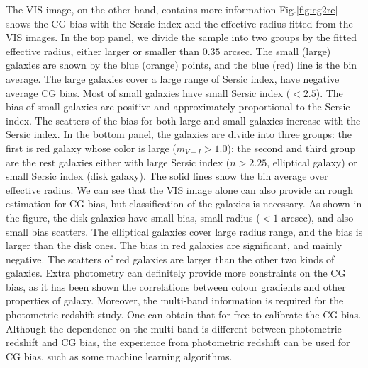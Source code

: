 \documentclass[useAMS,usenatbib]{mnras}
\newcommand{\be}{\begin{equation}}
\newcommand{\ee}{\end{equation}}
\def\elabel#1{\label{eq:#1}}
\begin{document}
The VIS image, on the other hand, contains more information
Fig.\ref{fig:cg2re} shows the CG bias with the Sersic index
and the effective radius fitted from the VIS images. In the top panel,
we divide the sample into two groups by the fitted effective radius,
either larger or smaller than $0.35$ arcsec. The small (large)
galaxies are shown by the blue (orange) points, and the blue (red)
line is the bin average.  The large galaxies cover a large range of
Sersic index, have negative average CG bias. Most of small galaxies
have small Sersic index ($<2.5$). The bias of small galaxies are
positive and approximately proportional to the Sersic index. The
scatters of the bias for both large and small galaxies increase with
the Sersic index.
%
In the bottom panel, the galaxies are divide into three groups: the
first is red galaxy whose color is large ($m_{V-I}>1.0$); the second
and third group are the rest galaxies either with large Sersic index
($n>2.25$, elliptical galaxy) or small Sersic index (disk galaxy). The
solid lines show the bin average over effective radius.
%
%
%
We can see that the VIS image alone can also provide an rough
estimation for CG bias, but classification of the galaxies is
necessary. As shown in the figure, the disk galaxies have small bias,
small radius ($<1$ arcsec), and also small bias scatters. The
elliptical galaxies cover large radius range, and the bias is larger
than the disk ones. The bias in red galaxies are significant, and
mainly negative. The scatters of red galaxies are larger than the
other two kinds of galaxies.
%
Extra photometry can definitely provide more constraints on the CG
bias, as it has been shown the correlations between colour gradients and
other properties of galaxy. Moreover, the multi-band
information is required for the photometric redshift study. One can
obtain that for free to calibrate the CG bias. Although the dependence
on the multi-band is different between photometric redshift and CG
bias, the experience from photometric redshift can be used for CG
bias, such as some machine learning algorithms.
\end{document}
